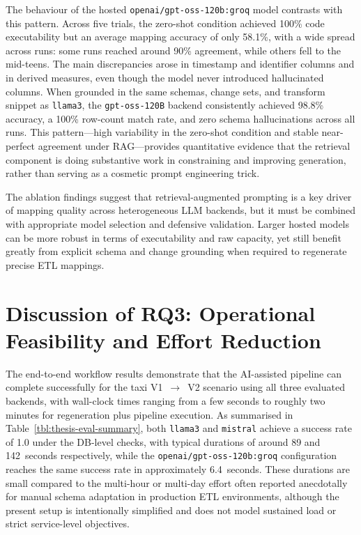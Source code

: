 The behaviour of the hosted \texttt{openai/gpt-oss-120b:groq} model contrasts with this pattern.
Across five trials, the zero-shot condition achieved 100\% code executability but an average mapping
accuracy of only 58.1\%, with a wide spread across runs: some runs reached around 90\% agreement,
while others fell to the mid-teens. The main discrepancies arose in timestamp and identifier
columns and in derived measures, even though the model never introduced hallucinated columns.
When grounded in the same schemas, change sets, and transform snippet as \texttt{llama3}, the
\texttt{gpt-oss-120B} backend consistently achieved 98.8\% accuracy, a 100\% row-count match rate,
and zero schema hallucinations across all runs. This pattern---high variability in the zero-shot
condition and stable near-perfect agreement under RAG---provides quantitative evidence that the
retrieval component is doing substantive work in constraining and improving generation, rather than
serving as a cosmetic prompt engineering trick.

The ablation findings suggest that retrieval-augmented prompting is a key driver of mapping quality across heterogeneous LLM backends, but it must be combined with appropriate model selection and defensive validation. Larger hosted models can be more robust in terms of executability and raw capacity, yet still benefit greatly from explicit schema and change grounding when required to regenerate precise ETL mappings.


\section{Discussion of RQ3: Operational Feasibility and Effort Reduction}
\label{sec:discussion-rq3}

The end-to-end workflow results demonstrate that the AI-assisted pipeline can complete successfully for the taxi V1~$\rightarrow$~V2 scenario using all three evaluated backends, with wall-clock times ranging from a few seconds to roughly two minutes for regeneration plus pipeline execution. As summarised in Table~\ref{tbl:thesis-eval-summary}, both \texttt{llama3} and \texttt{mistral} achieve a success rate of 1.0 under the DB-level checks, with typical durations of around 89 and 142~seconds respectively, while the \texttt{openai/gpt-oss-120b:groq} configuration reaches the same success rate in approximately 6.4~seconds. These durations are small compared to the multi-hour or multi-day effort often reported anecdotally for manual schema adaptation in production ETL environments, although the present setup is intentionally simplified and does not model sustained load or strict service-level objectives.

